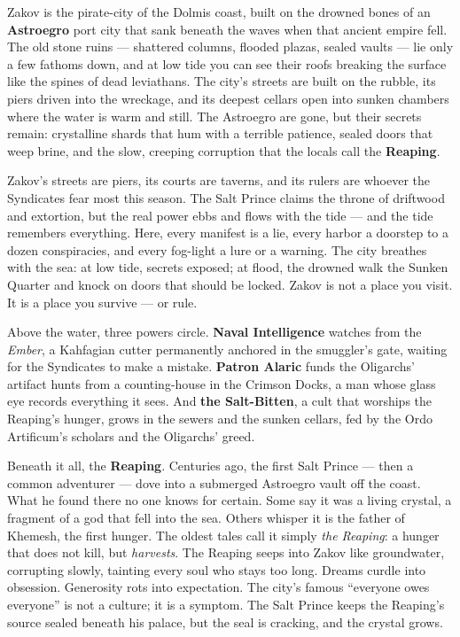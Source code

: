\documentclass[12pt,oneside]{book}
\begin{document}
\begin{tcolorbox}[colback=black!3,colframe=blue!60!black,title={Theme \& Atmosphere},breakable]
Zakov is the pirate-city of the Dolmis coast, built on the drowned bones of an \textbf{Astroegro} port city that sank beneath the waves when that ancient empire fell. The old stone ruins --- shattered columns, flooded plazas, sealed vaults --- lie only a few fathoms down, and at low tide you can see their roofs breaking the surface like the spines of dead leviathans. The city's streets are built on the rubble, its piers driven into the wreckage, and its deepest cellars open into sunken chambers where the water is warm and still. The Astroegro are gone, but their secrets remain: crystalline shards that hum with a terrible patience, sealed doors that weep brine, and the slow, creeping corruption that the locals call the \textbf{Reaping}.

Zakov's streets are piers, its courts are taverns, and its rulers are whoever the Syndicates fear most this season. The Salt Prince claims the throne of driftwood and extortion, but the real power ebbs and flows with the tide --- and the tide remembers everything. Here, every manifest is a lie, every harbor a doorstep to a dozen conspiracies, and every fog-light a lure or a warning. The city breathes with the sea: at low tide, secrets exposed; at flood, the drowned walk the Sunken Quarter and knock on doors that should be locked. Zakov is not a place you visit. It is a place you survive --- or rule.

Above the water, three powers circle. \textbf{Naval Intelligence} watches from the \textit{Ember}, a Kahfagian cutter permanently anchored in the smuggler's gate, waiting for the Syndicates to make a mistake. \textbf{Patron Alaric} funds the Oligarchs' artifact hunts from a counting-house in the Crimson Docks, a man whose glass eye records everything it sees. And \textbf{the Salt-Bitten}, a cult that worships the Reaping's hunger, grows in the sewers and the sunken cellars, fed by the Ordo Artificum's scholars and the Oligarchs' greed.

Beneath it all, the \textbf{Reaping}. Centuries ago, the first Salt Prince --- then a common adventurer --- dove into a submerged Astroegro vault off the coast. What he found there no one knows for certain. Some say it was a living crystal, a fragment of a god that fell into the sea. Others whisper it is the father of Khemesh, the first hunger. The oldest tales call it simply \textit{the Reaping}: a hunger that does not kill, but \textit{harvests}. The Reaping seeps into Zakov like groundwater, corrupting slowly, tainting every soul who stays too long. Dreams curdle into obsession. Generosity rots into expectation. The city's famous ``everyone owes everyone'' is not a culture; it is a symptom. The Salt Prince keeps the Reaping's source sealed beneath his palace, but the seal is cracking, and the crystal grows.


\end{tcolorbox}
\end{document}
